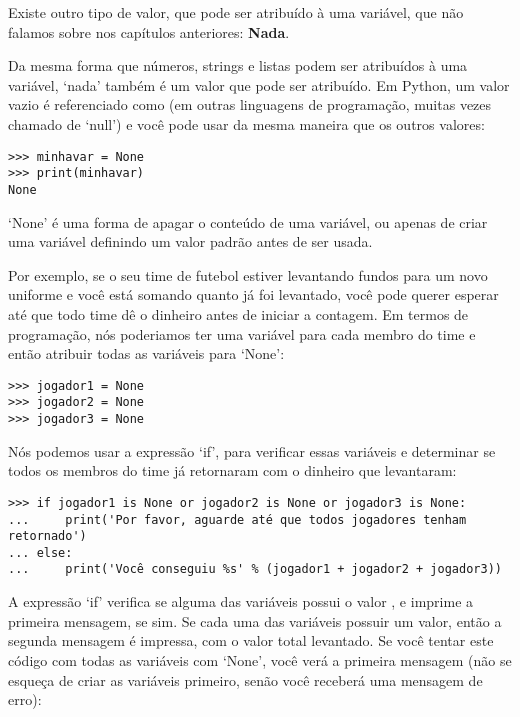 Existe outro tipo de valor, que pode ser atribuído à uma variável, que não falamos sobre nos capítulos anteriores: \textbf{Nada}.
\par
Da mesma forma que números, strings e listas podem ser atribuídos à uma variável, `nada' também é um valor que pode ser atribuído. Em Python, um valor vazio é referenciado como  (em outras linguagens de programação, muitas vezes chamado de `null') e você pode usar da mesma maneira que os outros valores:

\begin{listing}
\begin{verbatim}
>>> minhavar = None
>>> print(minhavar)
None
\end{verbatim}
\end{listing}

`None' é uma forma de apagar o conteúdo de uma variável, ou apenas de criar uma variável definindo um valor padrão antes de ser usada.
\par
Por exemplo, se o seu time de futebol estiver levantando fundos para um novo uniforme e você está somando quanto já foi levantado, você pode querer esperar até que todo time dê o dinheiro antes de iniciar a contagem. Em termos de programação, nós poderiamos ter uma variável para cada membro do time e então atribuir todas as variáveis para `None':

\begin{listing}
\begin{verbatim}
>>> jogador1 = None
>>> jogador2 = None
>>> jogador3 = None
\end{verbatim}
\end{listing}

Nós podemos usar a expressão `if', para verificar essas variáveis e determinar se todos os membros do time já retornaram com o dinheiro que levantaram:

\begin{listing}
\begin{verbatim}
>>> if jogador1 is None or jogador2 is None or jogador3 is None:
...     print('Por favor, aguarde até que todos jogadores tenham retornado')
... else:
...     print('Você conseguiu %s' % (jogador1 + jogador2 + jogador3))
\end{verbatim}
\end{listing}

A expressão `if' verifica se alguma das variáveis possui o valor , e imprime a primeira mensagem, se sim. Se cada uma das variáveis possuir um valor, então a segunda mensagem é impressa, com o valor total levantado. Se você tentar este código com todas as variáveis com `None', você verá a primeira mensagem (não se esqueça de criar as variáveis primeiro, senão você receberá uma mensagem de erro):

